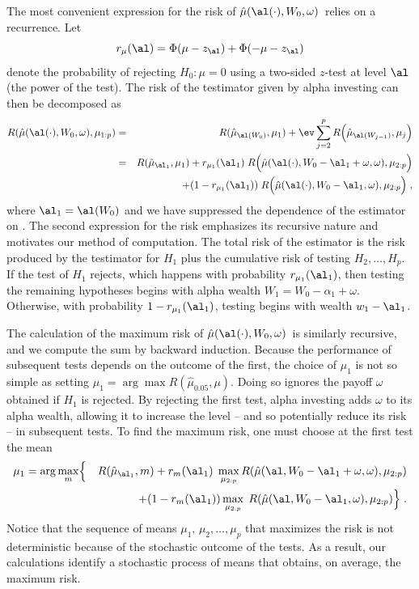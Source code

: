 \documentclass{gSCS2e}
\newcommand{\test}{\mbox{$\hat\mu(\al(\cdot),W_0,\omega)$}}
\begin{document}
 The most convenient expression for the risk of \test\ relies on a recurrence.
 Let
 \begin{displaymath}
   r_\mu(\al) = \Phi(\mu-z_\al)+\Phi(-\mu-z_\al)   
 \end{displaymath}
 denote the probability of rejecting $H_0: \mu=0$ using a two-sided $z$-test at
 level $\al$ (the power of the test).  The risk of the testimator given by alpha
 investing can then be decomposed as
 \begin{eqnarray}
   R(\hat\mu(\al(\cdot),W_0,\omega),\mu_{1:p}) 
    &=& R(\hat\mu_{\al(W_0)},\mu_1)
        + \ev \sum_{j=2}^p R\Bigl(\hat\mu_{\al(W_{j-1})},\mu_j\Bigr)  \cr
    &=& R(\hat\mu_{\al_1},\mu_1)
        + r_{\mu_1}(\al_1)\; 
          R\Bigl(\hat\mu(\al(\cdot),W_0-\al_1+\omega,\omega),\mu_{2:p}\Bigr)\cr
    & & \qquad + (1-r_{\mu_1}(\al_1))\; 
          R\Bigl(\hat\mu(\al(\cdot),W_0-\al_1,\omega),\mu_{2:p}\Bigr) \;,
 \label{eq:RMuHat}
 \end{eqnarray}
 where $\al_1 = \al(W_0)$ and we have suppressed the dependence of the estimator
 on \YY.  The second expression for the risk emphasizes its recursive nature and
 motivates our method of computation.  The total risk of the estimator is the
 risk produced by the testimator for $H_1$ plus the cumulative risk of testing
 $H_2, \ldots, H_p$.  If the test of $H_1$ rejects, which happens with
 probability $r_{\mu_1}(\al_1)$, then testing the remaining hypotheses begins
 with alpha wealth $W_1 = W_0 - \alpha_1 + \omega$.  Otherwise, with probability
 $1- r_{\mu_1}(\al_1)$, testing begins with wealth $w_1 - \al_1$.


 The calculation of the maximum risk of \test\ is similarly recursive,
 and we compute the sum by backward induction.  Because the performance of
 subsequent tests depends on the outcome of the first, the choice of $\mu_1$ is
 not so simple as setting $\mu_1 = \arg \max R(\hat\mu_{0.05}, \mu)$.  Doing so
 ignores the payoff $\omega$ obtained if $H_1$ is rejected.  By rejecting the
 first test, alpha investing adds
 $\omega$ to its alpha wealth, allowing it to increase the level -- and so
 potentially reduce its risk -- in subsequent tests.  To find the maximum risk, one 
 must choose at the first test the mean
 \begin{eqnarray*}
    \mu_1 = \arg \max_{m} & \Bigl\{ & R(\hat\mu_{\al_1},m) \Bigr. 
        + r_{m}(\al_1) \; \max_{\mu_{2:p}} 
              R(\hat\mu(\al,W_0-\al_1+\omega,\omega),\mu_{2:p})\cr
    & & + \Bigl. (1-r_{m}(\al_1)) \max_{\mu_{2:p}} \; 
              R(\hat\mu(\al,W_0-\al_1,\omega),\mu_{2:p}) \Bigr\} \;.
 \end{eqnarray*}
 Notice that the sequence of means $\mu_1,\, \mu_2,\ldots, \mu_p$ that maximizes the risk is
 not deterministic because of the stochastic outcome of the tests.  As a result,
 our calculations identify a stochastic process of means that obtains, on
 average, the maximum risk.
\end{document}
